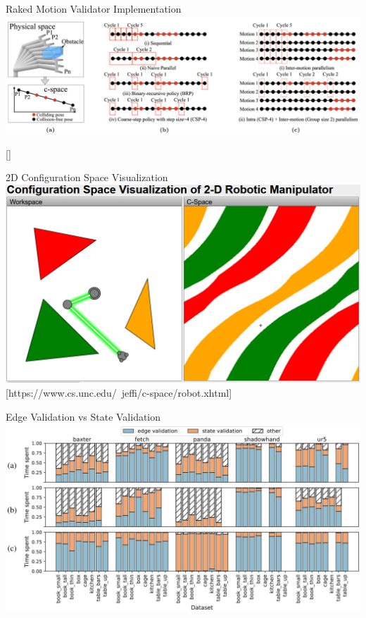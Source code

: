 \documentclass{beamer}
\begin{document}
\begin{frame}{Raked Motion Validator Implementation}
\includegraphics[width=\textwidth]{./assets/eemp_mv.png}

[\cite{paper:eemp}]
\end{frame}

\begin{frame}{2D Configuration Space Visualization}
\includegraphics[width=\textwidth]{./assets/c_space.png}
[https://www.cs.unc.edu/~jeffi/c-space/robot.xhtml]
\end{frame}

\begin{frame}{Edge Validation vs State Validation}
\includegraphics[width=\textwidth]{./assets/ev_sv_zoom.png}
\end{frame}
\end{document}
